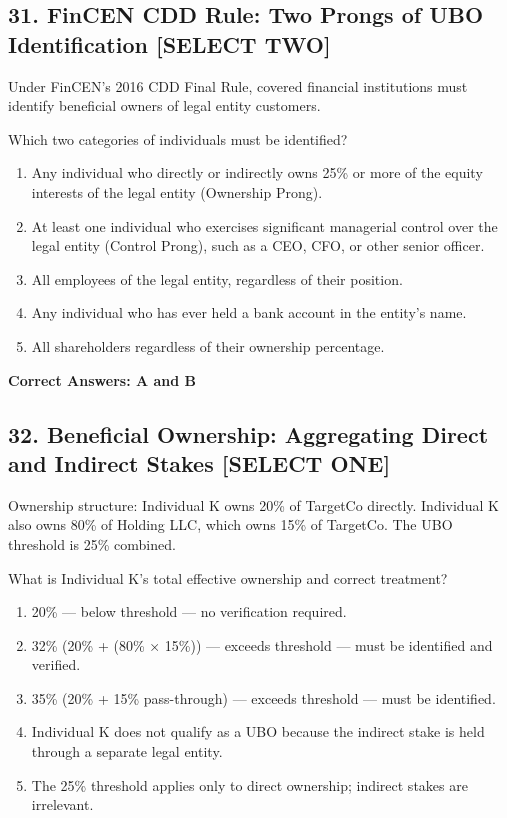 \documentclass[11pt,a4paper]{article}
\begin{document}
	\subsection{31. FinCEN CDD Rule: Two Prongs of UBO Identification \textnormal{[SELECT TWO]}}
	
	Under FinCEN's 2016 CDD Final Rule, covered financial institutions must identify beneficial owners of legal entity customers.
	
	Which two categories of individuals must be identified?
	
	\begin{enumerate}[label=\Alph*.]
		\item Any individual who directly or indirectly owns 25\% or more of the equity interests of the legal entity (Ownership Prong).
		\item At least one individual who exercises significant managerial control over the legal entity (Control Prong), such as a CEO, CFO, or other senior officer.
		\item All employees of the legal entity, regardless of their position.
		\item Any individual who has ever held a bank account in the entity's name.
		\item All shareholders regardless of their ownership percentage.
	\end{enumerate}
	
	\textbf{Correct Answers: A and B}
	
	\subsection{32. Beneficial Ownership: Aggregating Direct and Indirect Stakes \textnormal{[SELECT ONE]}}
	
	Ownership structure: Individual K owns 20\% of TargetCo directly. Individual K also owns 80\% of Holding LLC, which owns 15\% of TargetCo. The UBO threshold is 25\% combined.
	
	What is Individual K's total effective ownership and correct treatment?
	
	\begin{enumerate}[label=\Alph*.]
		\item 20\% — below threshold — no verification required.
		\item 32\% (20\% + (80\% × 15\%)) — exceeds threshold — must be identified and verified.
		\item 35\% (20\% + 15\% pass-through) — exceeds threshold — must be identified.
		\item Individual K does not qualify as a UBO because the indirect stake is held through a separate legal entity.
		\item The 25\% threshold applies only to direct ownership; indirect stakes are irrelevant.
	\end{enumerate}
	
\end{document}
